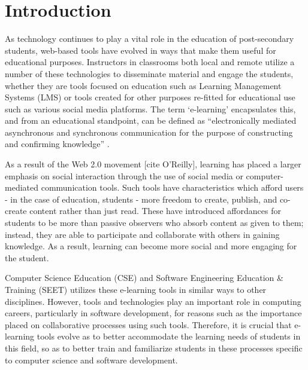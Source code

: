 \chapter{Introduction}



As technology continues to play a vital role in the education of post-secondary students, web-based tools have evolved in ways that make them useful for educational purposes. Instructors in classrooms both local and remote utilize a number of these technologies to disseminate material and engage the students, whether they are tools focused on education such as Learning Management Systems (LMS) or tools created for other purposes re-fitted for educational use such as various social media platforms. The term ‘e-learning’ encapsulates this, and from an educational standpoint, can be defined as “electronically mediated asynchronous and synchronous communication for the purpose of constructing and confirming knowledge” \cite{garrison2011learning}.

As a result of the Web 2.0 movement [cite O'Reilly], learning has placed a larger emphasis on social interaction through the use of social media or computer-mediated communication tools. Such tools have characteristics which afford users - in the case of education, students - more freedom to create, publish, and co-create content rather than just read. These have introduced affordances for students to be more than passive observers who absorb content as given to them; instead, they are able to participate and collaborate with others in gaining knowledge. As a result, learning can become more social and more engaging for the student.

Computer Science Education (CSE) and Software Engineering Education \& Training (SEET) utilizes these e-learning tools in similar ways to other disciplines. However, tools and technologies play an important role in computing careers, particularly in software development, for reasons such as the importance placed on collaborative processes using such tools. Therefore, it is crucial that e-learning tools evolve as to better accommodate the learning needs of students in this field, so as to better train and familiarize students in these processes specific to computer science and software development.

